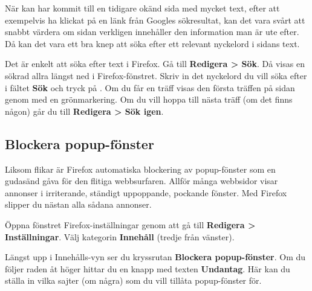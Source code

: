\documentclass[a4paper,final]{memoir} %
\begin{document}

När kan har kommit till en tidigare okänd sida med mycket text, efter att exempelvis ha klickat på en länk från Googles sökresultat, kan det vara svårt att snabbt värdera om sidan verkligen innehåller den information man är ute efter. Då kan det vara ett bra knep att söka efter ett relevant nyckelord i sidans text.

Det är enkelt att söka efter text i Firefox. Gå till \textbf{Redigera \textgreater{} Sök}. Då visas en sökrad allra längst ned i Firefox-fönstret. Skriv in det nyckelord du vill söka efter i fältet \textbf{Sök} och tryck på \xenter{}. Om du får en träff visas den första träffen på sidan genom med en grönmarkering. Om du vill hoppa till nästa träff (om det finns någon) går du till \textbf{Redigera \textgreater{} Sök igen}.



\subsection{Blockera popup-fönster}


Liksom flikar är Firefox automatiska blockering av popup-fönster som en gudasänd gåva för den flitiga webbsurfaren. Allför många webbsidor visar annonser i irriterande, ständigt uppoppande, pockande fönster. Med Firefox slipper du nästan alla sådana annonser.

Öppna fönstret Firefox-inställningar genom att gå till \textbf{Redigera \textgreater{} Inställningar}. Välj kategorin \textbf{Innehåll} (tredje från vänster). 

Längst upp i Innehålls-vyn ser du kryssrutan \textbf{Blockera popup-fönster}. Om du följer raden åt höger hittar du en knapp med texten \textbf{Undantag}. Här kan du ställa in vilka sajter (om några) som du vill tillåta popup-fönster för. 

\end{document}
